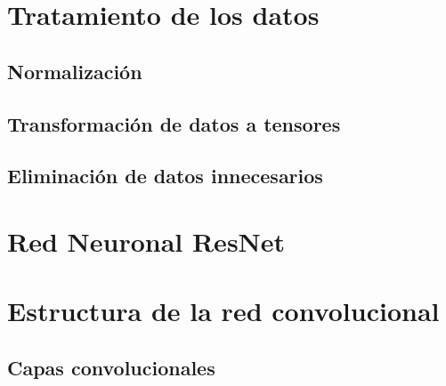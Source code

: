 
\section{Tratamiento de los datos}

\subsection{Normalización}

\subsection{}

\subsection{Transformación de datos a tensores}

\subsection{}

\subsection{}

\subsection{Eliminación de datos innecesarios}


\section{Red Neuronal ResNet}


\section{Estructura de la red convolucional}

\subsection{Capas convolucionales}

